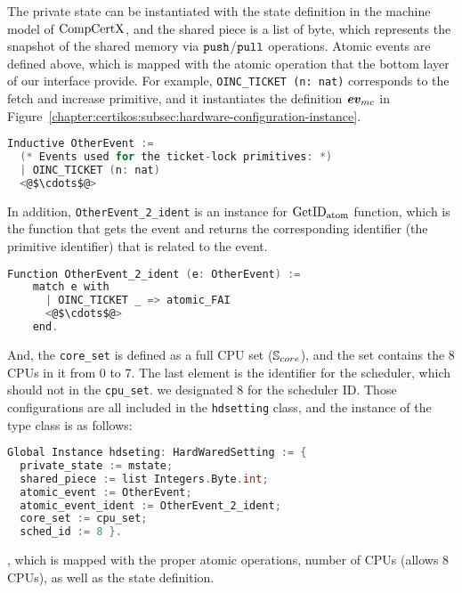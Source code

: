 The private state can be instantiated with 
the state definition in the machine model of $\mathrm{CompCertX}$,
and the shared piece is a list of byte, which represents 
the snapshot of the shared memory via ${\mathrm{\texttt{push}}}$/${\mathrm{\texttt{pull}}}$ operations. 
Atomic events are defined above, 
which is mapped with the atomic operation that the bottom layer of our interface provide.
For example, \lstinline$OINC_TICKET (n: nat)$ corresponds to the fetch and increase primitive,
and it instantiates the definition ${\mathrm{\textbf{\textit{ev}}}_{mc}}$ in Figure~\ref{chapter:certikos:subsec:hardware-configuration-instance}.
\begin{lstlisting}[language=C]
  Inductive OtherEvent :=
  (* Events used for the ticket-lock primitives: *)
  | OINC_TICKET (n: nat)
  <@$\cdots$@>
\end{lstlisting}
In addition, \lstinline$OtherEvent_2_ident$ is an instance for ${\mathrm{GetID}_{\mathrm{atom}}}$ function, which is the function
that gets the event and returns the corresponding identifier (the primitive identifier) that is related to the event.
\begin{lstlisting}[language=C]
  Function OtherEvent_2_ident (e: OtherEvent) :=
    match e with
      | OINC_TICKET _ => atomic_FAI
      <@$\cdots$@>
    end.
\end{lstlisting}
And, the \lstinline$core_set$ is defined as a full CPU set (${\mathbb{S}_{core}}$), and 
the set contains the 8 CPUs in it from 0 to 7.
The last element is the identifier for 
the scheduler, which should not in the \lstinline$cpu_set$. 
we designated 8 for the scheduler ID.
Those configurations are all included in the 
\lstinline$hdsetting$ class, and the instance of the type class
is as follows:
\begin{lstlisting}[language=C]
Global Instance hdseting: HardWaredSetting := {
  private_state := mstate;
  shared_piece := list Integers.Byte.int;
  atomic_event := OtherEvent;
  atomic_event_ident := OtherEvent_2_ident;
  core_set := cpu_set;
  sched_id := 8 }.
\end{lstlisting}
, which is mapped with 
the proper atomic operations, number of CPUs (allows 8 CPUs), 
as well as the state definition. 


